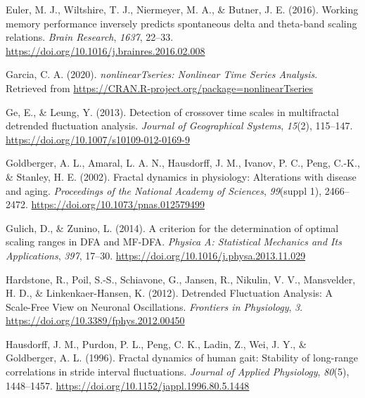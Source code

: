 \documentclass[
  man]{apa6}
\newlength{\cslhangindent}
\newlength{\cslentryspacingunit} %
\newenvironment{CSLReferences}[2] %
 {%
  \setlength{\parindent}{0pt}
  \ifodd #1
  \let\oldpar\par
  \def\par{\hangindent=\cslhangindent\oldpar}
  \fi
  \setlength{\parskip}{#2\cslentryspacingunit}
 }%
 {}
\begin{document}
\begin{CSLReferences}{1}{0}
\leavevmode{}%
Euler, M. J., Wiltshire, T. J., Niermeyer, M. A., \& Butner, J. E. (2016). Working memory performance inversely predicts spontaneous delta and theta-band scaling relations. \emph{Brain Research}, \emph{1637}, 22--33. \url{https://doi.org/10.1016/j.brainres.2016.02.008}

\leavevmode{}%
Garcia, C. A. (2020). \emph{{nonlinearTseries}: {Nonlinear} {Time} {Series} {Analysis}}. Retrieved from \url{https://CRAN.R-project.org/package=nonlinearTseries}

\leavevmode{}%
Ge, E., \& Leung, Y. (2013). Detection of crossover time scales in multifractal detrended fluctuation analysis. \emph{Journal of Geographical Systems}, \emph{15}(2), 115--147. \url{https://doi.org/10.1007/s10109-012-0169-9}

\leavevmode{}%
Goldberger, A. L., Amaral, L. A. N., Hausdorff, J. M., Ivanov, P. C., Peng, C.-K., \& Stanley, H. E. (2002). Fractal dynamics in physiology: {Alterations} with disease and aging. \emph{Proceedings of the National Academy of Sciences}, \emph{99}(suppl 1), 2466--2472. \url{https://doi.org/10.1073/pnas.012579499}

\leavevmode{}%
Gulich, D., \& Zunino, L. (2014). A criterion for the determination of optimal scaling ranges in {DFA} and {MF}-{DFA}. \emph{Physica A: Statistical Mechanics and Its Applications}, \emph{397}, 17--30. \url{https://doi.org/10.1016/j.physa.2013.11.029}

\leavevmode{}%
Hardstone, R., Poil, S.-S., Schiavone, G., Jansen, R., Nikulin, V. V., Mansvelder, H. D., \& Linkenkaer-Hansen, K. (2012). Detrended {Fluctuation} {Analysis}: {A} {Scale}-{Free} {View} on {Neuronal} {Oscillations}. \emph{Frontiers in Physiology}, \emph{3}. \url{https://doi.org/10.3389/fphys.2012.00450}

\leavevmode{}%
Hausdorff, J. M., Purdon, P. L., Peng, C. K., Ladin, Z., Wei, J. Y., \& Goldberger, A. L. (1996). Fractal dynamics of human gait: Stability of long-range correlations in stride interval fluctuations. \emph{Journal of Applied Physiology}, \emph{80}(5), 1448--1457. \url{https://doi.org/10.1152/jappl.1996.80.5.1448}


\end{CSLReferences}
\end{document}
